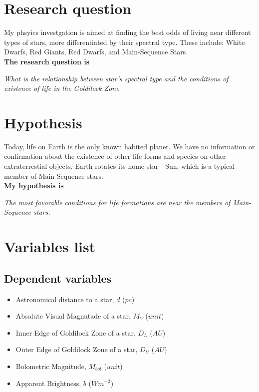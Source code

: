 \documentclass[a4paper]{IEEEtran}
\begin{document}
\section{Research question}

My phsyics investgation is aimed at finding the best odds of living near different types of stars, more differentiated by their spectral type. These include: White Dwarfs, Red Giants, Red Dwarfs, and Main-Sequence Stars.\\

\textbf{The research question is}

\textit{What is the relationship between star's spectral type and the conditions of existence of life in the Goldilock Zone}

\section{Hypothesis}

Today, life on Earth is the only known habited planet. We have no information or confirmation about the existence of other life forms and species on other extraterrestial objects. Earth rotates its home star - Sun, which is a typical member of Main-Sequence stars.\\

\textbf{My hypothesis is}

  \textit{The most favorable conditions for life formations are near the members of Main-Sequence stars.}

  \newpage
  \section{Variables list}

\subsection{Dependent variables}
  
  \begin{itemize}

    \item Astronomical distance to a star, $d$ ($pc$)

    \item Absolute Visual Magnutade of a star, $M_V$ ($unit$)
      
    \item Inner Edge of Goldilock Zone of a star, $D_L$ ($AU$) 

      \item Outer Edge of Goldilock Zone of a star, $D_U$ ($AU$)

        \item Bolometric Magnitude, $M_{bol}$ ($unit$)

          \item Apparent Brightness, $b$ ($W m^{-2}$)
          
  \end{itemize}
\end{document}
